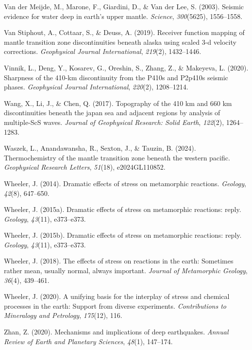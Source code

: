 \documentclass[draft,linenumbers]{agujournal2019}
\newlength{\cslhangindent}
\newenvironment{CSLReferences}[2]
 {\begin{list}{}{
  \setlength{\itemindent}{0pt}
  \setlength{\leftmargin}{0pt}
  \setlength{\parsep}{0pt}
  \ifodd #1
   \setlength{\leftmargin}{\cslhangindent}
   \setlength{\itemindent}{-\cslhangindent}
  \fi
  \setlength{\itemsep}{#2\baselineskip}
  }
  \item\relax}
 {\end{list}}
\begin{document}
\begin{CSLReferences}{1}{0}
Van der Meijde, M., Marone, F., Giardini, D., \& Van der Lee, S. (2003).
Seismic evidence for water deep in earth's upper mantle. \emph{Science},
\emph{300}(5625), 1556--1558.

Van Stiphout, A., Cottaar, S., \& Deuss, A. (2019). Receiver function
mapping of mantle transition zone discontinuities beneath alaska using
scaled 3-d velocity corrections. \emph{Geophysical Journal
International}, \emph{219}(2), 1432--1446.

Vinnik, L., Deng, Y., Kosarev, G., Oreshin, S., Zhang, Z., \& Makeyeva,
L. (2020). Sharpness of the 410-km discontinuity from the P410s and
P2p410s seismic phases. \emph{Geophysical Journal International},
\emph{220}(2), 1208--1214.

Wang, X., Li, J., \& Chen, Q. (2017). Topography of the 410 km and 660
km discontinuities beneath the japan sea and adjacent regions by
analysis of multiple-ScS waves. \emph{Journal of Geophysical Research:
Solid Earth}, \emph{122}(2), 1264--1283.

Waszek, L., Anandawansha, R., Sexton, J., \& Tauzin, B. (2024).
Thermochemistry of the mantle transition zone beneath the western
pacific. \emph{Geophysical Research Letters}, \emph{51}(18),
e2024GL110852.

Wheeler, J. (2014). Dramatic effects of stress on metamorphic reactions.
\emph{Geology}, \emph{42}(8), 647--650.

Wheeler, J. (2015a). Dramatic effects of stress on metamorphic
reactions: reply. \emph{Geology}, \emph{43}(11), e373--e373.

Wheeler, J. (2015b). Dramatic effects of stress on metamorphic
reactions: reply. \emph{Geology}, \emph{43}(11), e373--e373.

Wheeler, J. (2018). The effects of stress on reactions in the earth:
Sometimes rather mean, usually normal, always important. \emph{Journal
of Metamorphic Geology}, \emph{36}(4), 439--461.

Wheeler, J. (2020). A unifying basis for the interplay of stress and
chemical processes in the earth: Support from diverse experiments.
\emph{Contributions to Mineralogy and Petrology}, \emph{175}(12), 116.

Zhan, Z. (2020). Mechanisms and implications of deep earthquakes.
\emph{Annual Review of Earth and Planetary Sciences}, \emph{48}(1),
147--174.

\end{CSLReferences}
\end{document}
